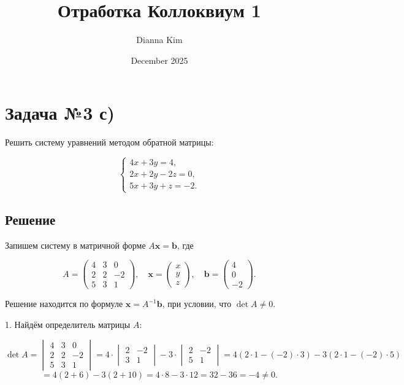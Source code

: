 \documentclass[12pt]{article}
\title{Отработка Коллоквиум 1}
\author{Dianna Kim}
\date{December 2025}
\begin{document}
\maketitle


\section*{Задача №3 с)}
Решить систему уравнений методом обратной матрицы:

\[
\begin{cases}
4x + 3y = 4, \\
2x + 2y - 2z = 0, \\
5x + 3y + z = -2.
\end{cases}
\]

\subsection*{Решение}
Запишем систему в матричной форме \( A \mathbf{x} = \mathbf{b} \), где

\[
A = 
\begin{pmatrix}
4 & 3 & 0 \\
2 & 2 & -2 \\
5 & 3 & 1
\end{pmatrix},
\quad
\mathbf{x} = 
\begin{pmatrix}
x \\ y \\ z
\end{pmatrix},
\quad
\mathbf{b} = 
\begin{pmatrix}
4 \\ 0 \\ -2
\end{pmatrix}.
\]

Решение находится по формуле \( \mathbf{x} = A^{-1} \mathbf{b} \), при условии, что \( \det A \ne 0 \).

1. Найдём определитель матрицы \( A \):

\[
\det A =
\begin{vmatrix}
4 & 3 & 0 \\
2 & 2 & -2 \\
5 & 3 & 1
\end{vmatrix}
= 4 \cdot 
\begin{vmatrix}
2 & -2 \\
3 & 1
\end{vmatrix}
- 3 \cdot 
\begin{vmatrix}
2 & -2 \\
5 & 1
\end{vmatrix}
= 4(2 \cdot 1 - (-2) \cdot 3) - 3(2 \cdot 1 - (-2) \cdot 5)
\]
\[
= 4(2 + 6) - 3(2 + 10) = 4 \cdot 8 - 3 \cdot 12 = 32 - 36 = -4 \ne 0.
\]
\end{document}
